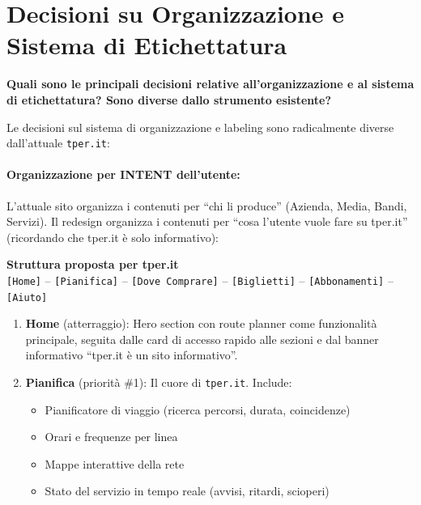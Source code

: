 \section{Decisioni su Organizzazione e Sistema di Etichettatura}

\begin{tcolorbox}[colback=primaryColor!10,colframe=primaryColor,arc=2mm]
\large\textbf{Quali sono le principali decisioni relative all'organizzazione e al sistema di etichettatura? Sono diverse dallo strumento esistente?}
\end{tcolorbox}

\vspace{0.3cm}

\begin{tcolorbox}[colback=backgroundColor,colframe=borderColor,arc=2mm]
{\small

Le decisioni sul sistema di organizzazione e labeling sono radicalmente diverse dall'attuale \texttt{tper.it}:

\paragraph{Organizzazione per INTENT dell'utente:}
L'attuale sito organizza i contenuti per ``chi li produce'' (Azienda, Media, Bandi, Servizi). Il redesign organizza i contenuti per ``cosa l'utente vuole fare su tper.it'' (ricordando che tper.it è solo informativo):

\begin{center}
\begin{tcolorbox}[colback=primaryColor!5,colframe=primaryColor,arc=2mm,width=0.95\textwidth]
\small
\textbf{Struttura proposta per tper.it} \\[4pt]
\texttt{[Home]} \;--\; \texttt{[Pianifica]} \;--\; \texttt{[Dove Comprare]} \;--\; \texttt{[Biglietti]} \;--\; \texttt{[Abbonamenti]} \;--\; \texttt{[Aiuto]}
\end{tcolorbox}
\end{center}

\begin{enumerate}[leftmargin=*]
 \item \textbf{Home} (atterraggio): Hero section con route planner come funzionalità principale, seguita dalle card di accesso rapido alle sezioni e dal banner informativo ``tper.it è un sito informativo''.

 \item \textbf{Pianifica} (priorità \#1): Il cuore di \texttt{tper.it}. Include:
 \begin{itemize}
   \item Pianificatore di viaggio (ricerca percorsi, durata, coincidenze)
   \item Orari e frequenze per linea
   \item Mappe interattive della rete
   \item Stato del servizio in tempo reale (avvisi, ritardi, scioperi)
 \end{itemize}


\end{enumerate}}
\end{tcolorbox}
